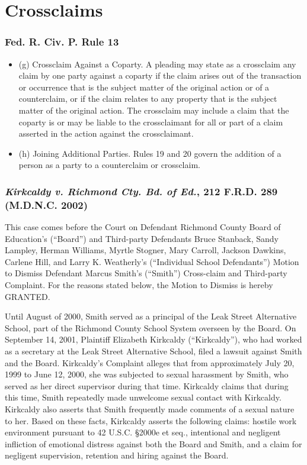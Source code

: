 \documentclass[11pt,letterpaper,twoside]{article}
\providecommand{\tightlist}{%
\setlength{\itemsep}{0em}\setlength{\parskip}{0em}\setlength{\itemindent}{0em}}
\begin{document}
\section{Crossclaims}\label{crossclaims}

\subsubsection{Fed. R. Civ. P. Rule 13}\label{fedciv_rule13-1}

\begin{itemize}
\tightlist
\item
  (g) Crossclaim Against a Coparty. A pleading may state as a crossclaim
  any claim by one party against a coparty if the claim arises out of
  the transaction or occurrence that is the subject matter of the
  original action or of a counterclaim, or if the claim relates to any
  property that is the subject matter of the original action. The
  crossclaim may include a claim that the coparty is or may be liable to
  the crossclaimant for all or part of a claim asserted in the action
  against the crossclaimant.
\item
  (h) Joining Additional Parties. Rules 19 and 20 govern the addition of
  a person as a party to a counterclaim or crossclaim.
\end{itemize}

\subsubsection{\texorpdfstring{\emph{Kirkcaldy v. Richmond Cty. Bd. of
Ed.}, 212 F.R.D. 289 (M.D.N.C.
2002)}{Kirkcaldy v. Richmond Cty. Bd. of Ed., 212 F.R.D. 289 (M.D.N.C. 2002)}}\label{kirkcaldyrichmondctybd_mdnc2002}

This case comes before the Court on Defendant Richmond County Board of
Education's (``Board'') and Third-party Defendants Bruce Stanback, Sandy
Lampley, Herman Williams, Myrtle Stogner, Mary Carroll, Jackson Dawkins,
Carlene Hill, and Larry K. Weatherly's (``Individual School
Defendants'') Motion to Dismiss Defendant Marcus Smith's (``Smith'')
Cross-claim and Third-party Complaint. For the reasons stated below, the
Motion to Dismiss is hereby GRANTED.

Until August of 2000, Smith served as a principal of the Leak Street
Alternative School, part of the Richmond County School System overseen
by the Board. On September 14, 2001, Plaintiff Elizabeth Kirkcaldy
(``Kirkcaldy''), who had worked as a secretary at the Leak Street
Alternative School, filed a lawsuit against Smith and the Board.
Kirkcaldy's Complaint alleges that from approximately July 20, 1999 to
June 12, 2000, she was subjected to sexual harassment by Smith, who
served as her direct supervisor during that time. Kirkcaldy claims that
during this time, Smith repeatedly made unwelcome sexual contact with
Kirkcaldy. Kirkcaldy also asserts that Smith frequently made comments of
a sexual nature to her. Based on these facts, Kirkcaldy asserts the
following claims: hostile work environment pursuant to 42 U.S.C. §2000e
et seq., intentional and negligent infliction of emotional distress
against both the Board and Smith, and a claim for negligent supervision,
retention and hiring against the Board.
\end{document}
